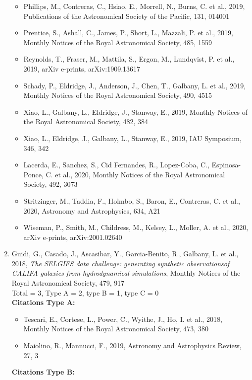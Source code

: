 \documentclass{letter}
\begin{document}
\begin{enumerate}
\begin{itemize}
\item Phillips, M., Contreras, C., Hsiao, E., Morrell, N., Burns, C. et al., 2019, Publications of the Astronomical Society of the Pacific, 131, 014001
\item Prentice, S., Ashall, C., James, P., Short, L., Mazzali, P. et al., 2019, Monthly Notices of the Royal Astronomical Society, 485, 1559
\item Reynolds, T., Fraser, M., Mattila, S., Ergon, M., Lundqvist, P. et al., 2019, arXiv e-prints, arXiv:1909.13617
\item Schady, P., Eldridge, J., Anderson, J., Chen, T., Galbany, L. et al., 2019, Monthly Notices of the Royal Astronomical Society, 490, 4515
\item Xiao, L., Galbany, L., Eldridge, J., Stanway, E., 2019, Monthly Notices of the Royal Astronomical Society, 482, 384
\item Xiao, L., Eldridge, J., Galbany, L., Stanway, E., 2019, IAU Symposium, 346, 342
\item Lacerda, E., Sanchez, S., Cid Fernandes, R., Lopez-Coba, C., Espinosa-Ponce, C. et al., 2020, Monthly Notices of the Royal Astronomical Society, 492, 3073
\item Stritzinger, M., Taddia, F., Holmbo, S., Baron, E., Contreras, C. et al., 2020, Astronomy and Astrophysics, 634, A21
\item Wiseman, P., Smith, M., Childress, M., Kelsey, L., Moller, A. et al., 2020, arXiv e-prints, arXiv:2001.02640
\end{itemize}
\item Guidi, G., Casado, J., Ascasibar, Y., Garcia-Benito, R., Galbany, L. et al., 2018, {\it The SELGIFS data challenge: generating synthetic observationsof CALIFA galaxies from hydrodynamical simulations}, Monthly Notices of the Royal Astronomical Society, 479, 917 \\ 
Total = 3, Type A = 2, type B = 1, type C = 0 \\ 
{\bf Citations Type A:}
\begin{itemize}
\item Tescari, E., Cortese, L., Power, C., Wyithe, J., Ho, I. et al., 2018, Monthly Notices of the Royal Astronomical Society, 473, 380
\item Maiolino, R., Mannucci, F., 2019, Astronomy and Astrophysics Review, 27, 3
\end{itemize}
{\bf Citations Type B:}
\begin{itemize}

\end{itemize}
\end{enumerate}
\end{document}
